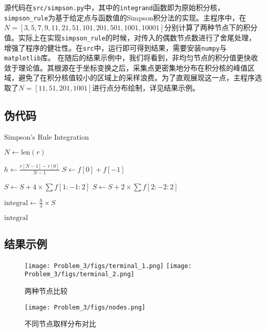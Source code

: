 源代码在\texttt{src/simpson.py}中，其中的\texttt{integrand}函数即为原始积分核，\texttt{simpson\_rule}为基于给定点与函数值的Simpson积分法的实现。主程序中，在$N=[3, 5, 7, 9, 11, 21, 51, 101, 201, 501, 1001, 10001]$分别计算了两种节点下的积分值。实际上在实现\texttt{simpson\_rule}的时候，对传入的偶数节点数进行了舍尾处理，增强了程序的健壮性。在\texttt{src}中，运行即可得到结果，需要安装\texttt{numpy}与\texttt{matplotlib}库。
在随后的结果示例中，我们将看到，非均匀节点的积分值更快收敛于理论值。其根源在于坐标变换之后，采集点更密集地分布在积分核的峰值区域，避免了在积分核值较小的区域上的采样浪费。为了直观展现这一点，主程序选取了$N = [11, 51, 201, 1001]$进行点分布绘制，详见结果示例。
\subsection{伪代码}
\begin{algorithm}[H]
    \caption{Simpson's Rule Integration}
    
    $N \gets \text{len}(r)$ 
    
    $h \gets \frac{r[N-1] - r[0]}{N - 1}$\;
    $S \gets f[0] + f[-1]$ 
    
    $S \gets S + 4 \times \sum f[1 : -1 : 2]$ 
    $S \gets S + 2 \times \sum f[2 : -2 : 2]$ 
    
    $\text{integral} \gets \frac{h}{3} \times S$

    \KwRet $\text{integral}$
    \end{algorithm}
    
\subsection{结果示例}
\begin{figure}[H]
    \centering
    \texttt{[image: Problem\_3/figs/terminal\_1.png]}
    \texttt{[image: Problem\_3/figs/terminal\_2.png]}
    \caption{两种节点比较}
\end{figure}

\begin{figure}[H]
    \centering
    \texttt{[image: Problem\_3/figs/nodes.png]}
    \caption{不同节点取样分布对比}
\end{figure}

